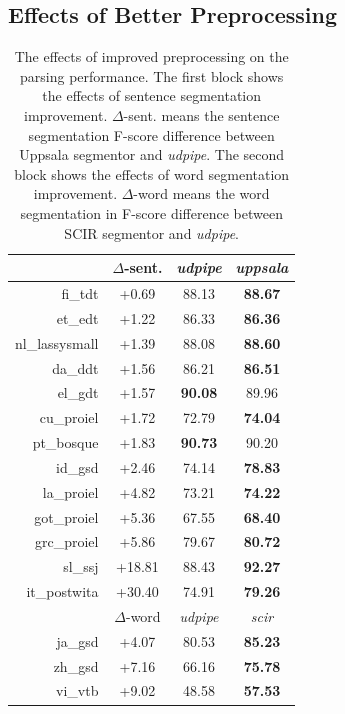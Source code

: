 \documentclass[11pt,a4paper]{article}
\begin{document}
\subsection{Effects of Better Preprocessing}
\begin{table}[t]
  \centering
  \small
  \begin{tabular}{rccc}
     & $\Delta$-sent. & \textit{udpipe} & \textit{uppsala} \\
    \hline
    fi\_tdt & +0.69 & 88.13 & \textbf{88.67} \\
    et\_edt & +1.22 & 86.33 & \textbf{86.36} \\
    nl\_lassysmall & +1.39 & 88.08 & \textbf{88.60} \\
    da\_ddt & +1.56 & 86.21 & \textbf{86.51} \\
    el\_gdt & +1.57 & \textbf{90.08} & 89.96  \\
    cu\_proiel & +1.72 & 72.79 & \textbf{74.04} \\
    pt\_bosque & +1.83 & \textbf{90.73} & 90.20 \\
    id\_gsd & +2.46 & 74.14 & \textbf{78.83} \\
    la\_proiel & +4.82 & 73.21 & \textbf{74.22} \\
    got\_proiel & +5.36 & 67.55 & \textbf{68.40} \\
    grc\_proiel & +5.86 & 79.67 & \textbf{80.72} \\
    sl\_ssj & +18.81& 88.43 & \textbf{92.27} \\
    it\_postwita & +30.40 &74.91 & \textbf{79.26} \\
    \hline
    \hline
    & $\Delta$-word & \textit{udpipe} & \textit{scir} \\
    ja\_gsd & +4.07 & 80.53 & \textbf{85.23} \\
    zh\_gsd & +7.16 & 66.16 & \textbf{75.78} \\
    vi\_vtb & +9.02 & 48.58 & \textbf{57.53} \\
  \end{tabular}
\caption{The effects of improved preprocessing on the parsing performance.
	The first block shows the effects of sentence segmentation improvement.
	$\Delta$-sent. means the sentence segmentation F-score  difference between Uppsala segmentor and \textit{udpipe}.
	The second block shows the effects of word segmentation improvement.
	$\Delta$-word means the word segmentation in F-score difference  between SCIR segmentor and \textit{udpipe}.}\label{tbl:preprocess}
\end{table}
\end{document}
